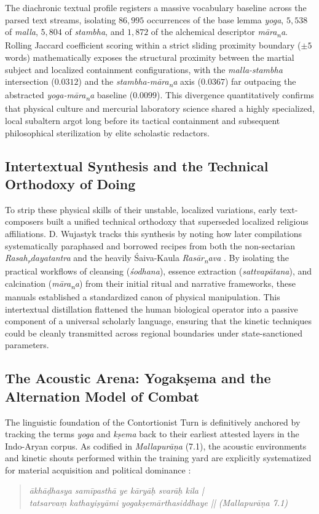 \documentclass[11pt,twoside,letterpaper]{article}
\begin{document}
The diachronic textual profile registers a massive vocabulary baseline across the parsed text streams, isolating $86,995$ occurrences of the base lemma \textit{yoga}, $5,538$ of \textit{malla}, $5,804$ of \textit{stambha}, and $1,872$ of the alchemical descriptor \textit{m\={a}ra\textsubscript{n}a}. Rolling Jaccard coefficient scoring within a strict sliding proximity boundary (\(\pm 5\) words) mathematically exposes the structural proximity between the martial subject and localized containment configurations, with the \textit{malla-stambha} intersection ($0.0312$) and the \textit{stambha-m\={a}ra\textsubscript{n}a} axis ($0.0367$) far outpacing the abstracted \textit{yoga-m\={a}ra\textsubscript{n}a} baseline ($0.0099$). This divergence quantitatively confirms that physical culture and mercurial laboratory science shared a highly specialized, local subaltern argot long before its tactical containment and subsequent philosophical sterilization by elite scholastic redactors.


\subsection{Intertextual Synthesis and the Technical Orthodoxy of Doing}
To strip these physical skills of their unstable, localized variations, early text-composers built a unified technical orthodoxy that superseded localized religious affiliations. D. Wujastyk tracks this synthesis by noting how later compilations systematically paraphased and borrowed recipes from both the non-sectarian \textit{Rasah\textsubscript{r}dayatantra} and the heavily Śaiva-Kaula \textit{Ras\={a}r\textsubscript{n}ava} \cite{Wujastyk2025}. By isolating the practical workflows of cleansing (\textit{\'sodhana}), essence extraction (\textit{sattvap\={a}tana}), and calcination (\textit{m\={a}ra\textsubscript{n}a}) from their initial ritual and narrative frameworks, these manuals established a standardized canon of physical manipulation. This intertextual distillation flattened the human biological operator into a passive component of a universal scholarly language, ensuring that the kinetic techniques could be cleanly transmitted across regional boundaries under state-sanctioned parameters.

\subsection{The Acoustic Arena: Yogakṣema and the Alternation Model of Combat}

The linguistic foundation of the Contortionist Turn is definitively anchored by tracking the terms \textit{yoga} and \textit{kṣema} back to their earliest attested layers in the Indo-Aryan corpus. As codified in \textit{Mallapurāṇa} (7.1), the acoustic environments and kinetic shouts performed within the training yard are explicitly systematized for material acquisition and political dominance \cite{MP_7}:
\begin{quote}
    \textit{ākhāḍhasya samīpasthā ye kāryāḥ svarāḥ kila |} \\
    \textit{tatsarvaṃ kathayiṣyāmi yogakṣemārthasiddhaye || (Mallapurāṇa 7.1)}
\end{quote}
\end{document}
